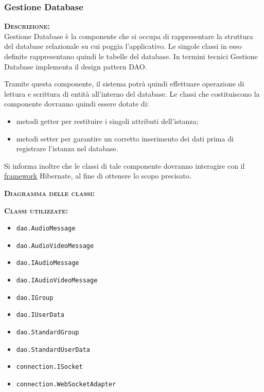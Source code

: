 \subsubsection{Gestione Database}
\begin{description}
	\item{\scshape\bfseries Descrizione:}\\
	Gestione Database è la componente che si occupa di rappresentare la struttura del database relazionale su cui poggia l'applicativo. Le singole classi in esso definite rappresentano quindi le tabelle del database. In termini tecnici Gestione Database implementa il design pattern DAO\@.

Tramite questa componente, il sistema potrà quindi effettuare operazione di lettura e scrittura di entità all'interno del database. Le classi che costituiscono la componente dovranno quindi essere dotate di:

\begin{itemize}
	\item metodi getter per restituire i singoli attributi dell'istanza;
	\item metodi setter per garantire un corretto inserimento dei dati prima di registrare l'istanza nel database.
\end{itemize}

Si informa inoltre che le classi di tale componente dovranno interagire con il \underline{framework} Hibernate, al fine di ottenere lo scopo precisato.

	\item{\scshape\bfseries Diagramma delle classi:}
	\item{\scshape\bfseries Classi utilizzate:}
\begin{itemize}
  \item \texttt{dao.AudioMessage}
  \item \texttt{dao.AudioVideoMessage}
  \item \texttt{dao.IAudioMessage}
  \item \texttt{dao.IAudioVideoMessage}
  \item \texttt{dao.IGroup}
  \item \texttt{dao.IUserData}
  \item \texttt{dao.StandardGroup}
  \item \texttt{dao.StandardUserData}
\end{itemize}
\end{description}

\begin{itemize}
	\item \texttt{connection.ISocket}
	\item \texttt{connection.WebSocketAdapter}
\end{itemize}

